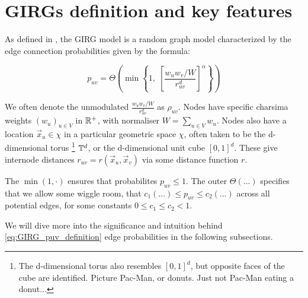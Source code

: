 \section{GIRGs definition and key features}
\label{sec:GIRG_def}

As defined in \cite{bringmann2019geometric}, the GIRG model is a random graph model characterized by the edge connection probabilities given by the formula:


\begin{equation}
    p_{uv} = \Theta \left ( \min \left \{
        1,\;
        \left [
            \frac{w_u w_v / W}{r_{uv}^d}
        \right ]^\alpha
    \right \}
    \right ) 
    \label{eq:GIRG_puv_definition}
\end{equation}

We often denote the unmodulated  $\frac{w_u w_v / W}{r_{uv}^d}$ as $\rho_{uv}$. Nodes have specific charsima weights $(w_u)_{u \in V}$ in $\mathbb{R}^+$, with normaliser $W = \sum_{u \in V} w_u$. Nodes also have a location $\vec{x}_u \in \chi$ in a particular geometric space $\chi$, often taken to be the d-dimensional torus
\footnote{The d-dimensional torus also resembles $[0, 1]^d$, but opposite faces of the cube are identified. Picture Pac-Man, or donuts. Just not Pac-Man eating a donut...}
$\mathbb{T}^d$, or the d-dimensional unit cube $[0, 1]^d$. These give internode distances $r_{uv} = r(\vec{x}_u, \vec{x}_v)$ via some distance function $r$.

The $\min(1, \cdot)$ ensures that probabilites $p_{uv} \leq 1$. The outer $\Theta(...)$ specifies that we allow some wiggle room, that $c_1 (...) \leq p_{uv} \leq c_2 (...)$ across all potential edges, for some constants $0 \leq c_1 \leq c_2 < 1$.

We will dive more into the significance and intuition behind \cref{eq:GIRG_puv_definition} edge probabilities in the following subsections.


